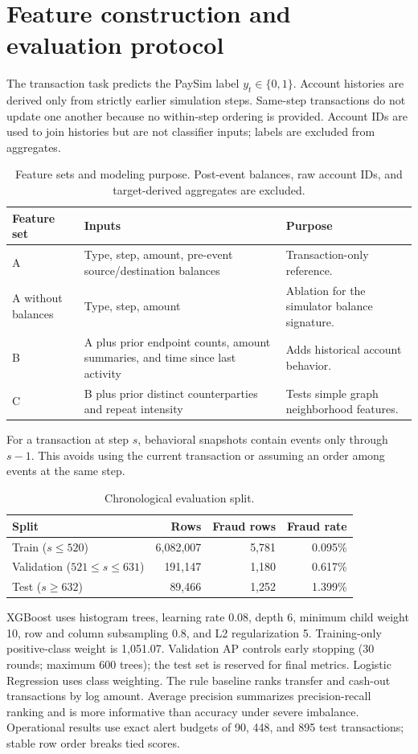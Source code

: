 \documentclass[11pt]{article}
\begin{document}
\section*{Feature construction and evaluation protocol}
The transaction task predicts the PaySim label $y_t\in\{0,1\}$. Account histories are derived only from strictly earlier simulation steps. Same-step transactions do not update one another because no within-step ordering is provided. Account IDs are used to join histories but are not classifier inputs; labels are excluded from aggregates.
\begin{table}[h]\centering\small\begin{tabularx}{\linewidth}{p{1.2in}p{2.6in}X}\toprule Feature set & Inputs & Purpose\\\midrule
A & Type, step, amount, pre-event source/destination balances & Transaction-only reference.\\
A without balances & Type, step, amount & Ablation for the simulator balance signature.\\
B & A plus prior endpoint counts, amount summaries, and time since last activity & Adds historical account behavior.\\
C & B plus prior distinct counterparties and repeat intensity & Tests simple graph neighborhood features.\\\bottomrule\end{tabularx}\caption{Feature sets and modeling purpose. Post-event balances, raw account IDs, and target-derived aggregates are excluded.}\end{table}
For a transaction at step $s$, behavioral snapshots contain events only through $s-1$. This avoids using the current transaction or assuming an order among events at the same step.
\begin{table}[h]\centering\small\begin{tabular}{lrrr}\toprule Split & Rows & Fraud rows & Fraud rate\\\midrule
Train ($s\leq520$) & 6,082,007 & 5,781 & 0.095\%\\
Validation ($521\leq s\leq631$) & 191,147 & 1,180 & 0.617\%\\
Test ($s\geq632$) & 89,466 & 1,252 & 1.399\%\\\bottomrule\end{tabular}\caption{Chronological evaluation split.}\end{table}
XGBoost uses histogram trees, learning rate 0.08, depth 6, minimum child weight 10, row and column subsampling 0.8, and L2 regularization 5. Training-only positive-class weight is 1,051.07. Validation AP controls early stopping (30 rounds; maximum 600 trees); the test set is reserved for final metrics. Logistic Regression uses class weighting. The rule baseline ranks transfer and cash-out transactions by log amount.
Average precision summarizes precision-recall ranking and is more informative than accuracy under severe imbalance. Operational results use exact alert budgets of 90, 448, and 895 test transactions; stable row order breaks tied scores.
\clearpage
\end{document}
